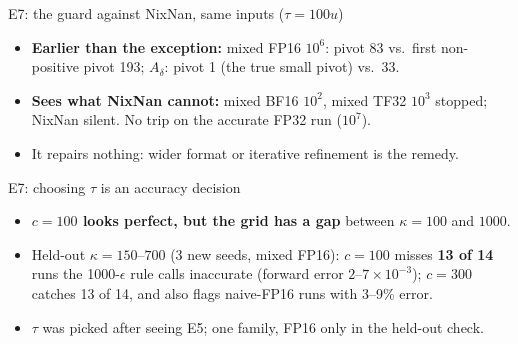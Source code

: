 \documentclass[aspectratio=169,10pt,xcolor=table]{beamer}
\begin{document}
\begin{frame}{E7: the guard against NixNan, same inputs ($\tau=100u$)}
\centering\scriptsize


\vspace{2mm}\raggedright\footnotesize
\begin{itemize}
\item \textbf{Earlier than the exception:} mixed FP16 $10^{6}$: pivot 83 vs.\ first non-positive pivot 193; $A_\delta$: pivot 1 (the true small pivot) vs.\ 33.
\item \textbf{Sees what NixNan cannot:} mixed BF16 $10^{2}$, mixed TF32 $10^{3}$ stopped; NixNan silent. No trip on the accurate FP32 run ($10^{7}$).
\item It repairs nothing: wider format or iterative refinement is the remedy.
\end{itemize}
\end{frame}

\begin{frame}{E7: choosing $\tau$ is an accuracy decision}
\centering\scriptsize


\vspace{1mm}{\footnotesize non-ok flagged / non-ok, ok flagged / ok (150 E5 runs)}

\vspace{2mm}\raggedright\footnotesize
\begin{itemize}
\item \textbf{$c=100$ looks perfect, but the grid has a gap} between $\kappa=100$ and $1000$.
\item Held-out $\kappa=150$--$700$ (3 new seeds, mixed FP16): $c=100$ misses \textbf{13 of 14} runs the 1000-$\epsilon$ rule calls inaccurate (forward error $2$--$7\times10^{-3}$); $c=300$ catches 13 of 14, and also flags naive-FP16 runs with 3--9\% error.
\item $\tau$ was picked after seeing E5; one family, FP16 only in the held-out check.
\end{itemize}
\end{frame}
\end{document}
